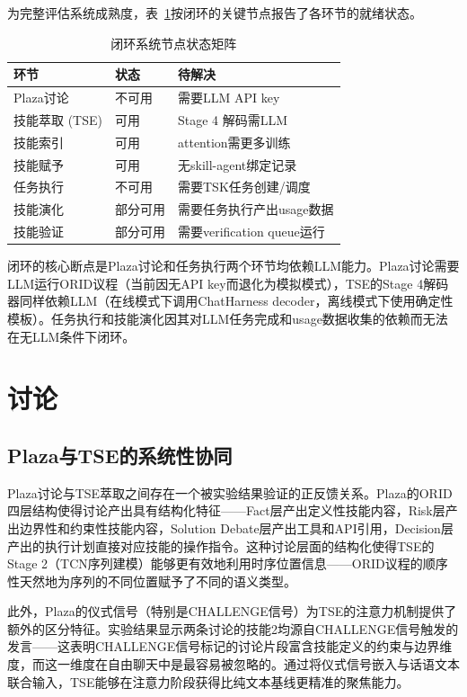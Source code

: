\documentclass[conference]{IEEEtran}
\begin{document}
为完整评估系统成熟度，表~\ref{tab:loop_status}按闭环的关键节点报告了各环节的就绪状态。

\begin{table}[t]
\centering
\caption{闭环系统节点状态矩阵}
\label{tab:loop_status}
\setlength{\tabcolsep}{2pt}
\renewcommand{\arraystretch}{1.1}
\begin{tabular}{lll}
\toprule
环节 & 状态 & 待解决 \\
\midrule
Plaza讨论 & \color{red}不可用 & 需要LLM API key \\
技能萃取 (TSE) & \color{green}可用 & Stage 4 解码需LLM \\
技能索引 & \color{green}可用 & attention需更多训练 \\
技能赋予 & \color{green}可用 & 无skill-agent绑定记录 \\
任务执行 & \color{red}不可用 & 需要TSK任务创建/调度 \\
技能演化 & \color{yellow}部分可用 & 需要任务执行产出usage数据 \\
技能验证 & \color{yellow}部分可用 & 需要verification queue运行 \\
\bottomrule
\end{tabular}
\end{table}

闭环的核心断点是Plaza讨论和任务执行两个环节均依赖LLM能力。Plaza讨论需要LLM运行ORID议程（当前因无API key而退化为模拟模式），TSE的Stage 4解码器同样依赖LLM（在线模式下调用ChatHarness decoder，离线模式下使用确定性模板）。任务执行和技能演化因其对LLM任务完成和usage数据收集的依赖而无法在无LLM条件下闭环。

\section{讨论}

\subsection{Plaza与TSE的系统性协同}

Plaza讨论与TSE萃取之间存在一个被实验结果验证的正反馈关系。Plaza的ORID四层结构使得讨论产出具有结构化特征——Fact层产出定义性技能内容，Risk层产出边界性和约束性技能内容，Solution Debate层产出工具和API引用，Decision层产出的执行计划直接对应技能的操作指令。这种讨论层面的结构化使得TSE的Stage 2（TCN序列建模）能够更有效地利用时序位置信息——ORID议程的顺序性天然地为序列的不同位置赋予了不同的语义类型。

此外，Plaza的仪式信号（特别是CHALLENGE信号）为TSE的注意力机制提供了额外的区分特征。实验结果显示两条讨论的技能2均源自CHALLENGE信号触发的发言——这表明CHALLENGE信号标记的讨论片段富含技能定义的约束与边界维度，而这一维度在自由聊天中是最容易被忽略的。通过将仪式信号嵌入与话语文本联合输入，TSE能够在注意力阶段获得比纯文本基线更精准的聚焦能力。
\end{document}
